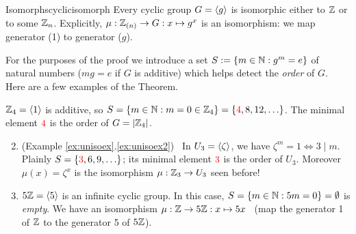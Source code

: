 \begin{thm}{Isomorphs}{cyclicisomorph}
	Every cyclic group $G=\left\langle g\right\rangle$ is isomorphic either to $\mathbb{Z}$ or to some $\mathbb{Z}_n$.\smallbreak
	Explicitly, $\mu:\mathbb{Z}_{(n)}\to G:x\mapsto g^x$ is an isomorphism: we map generator (1) to generator ($g$).
\end{thm}

For the purposes of the proof we introduce a set $S:=\{m\in\mathbb{N}:g^m=e\}$ of natural numbers ($mg=e$ if $G$ is additive) which helps detect the \emph{order} of $G$. Here are a few examples of the Theorem.

\begin{examples}{}{}
	\exstart $\mathbb{Z}_4=\left\langle 1\right\rangle$ is additive, so $S=\{m\in\mathbb{N}:m=0\in\mathbb{Z}_4\}=\{\textcolor{red}{4},8,12,\ldots\}$. The minimal element $\textcolor{red}{4}$ is the order of $G=\left| \mathbb{Z}_4\right|$.
	\begin{enumerate}\setcounter{enumi}{1}
	  \item (Example \ref*{ex:unisoex}.\ref{ex:unisoex2}) \ In $U_3=\left\langle \zeta\right\rangle$, we have $\zeta^m=1\Longleftrightarrow 3\mid m$. Plainly $S=\{\textcolor{red}{3},6,9,\ldots\}$; its minimal element $\textcolor{red}{3}$ is the order of $U_3$. Moreover $\mu(x)=\zeta^x$ is the isomorphism $\mu:\mathbb{Z}_3\to U_3$ seen before!
	  \item $5\mathbb{Z}=\left\langle 5\right\rangle$ is an infinite cyclic group. In this case, $S=\{m\in\mathbb{N}:5m=0\}=\emptyset$ is \emph{empty}. We have an isomorphism $\mu:\mathbb{Z}\to 5\mathbb{Z}:x\mapsto 5x$ \ (map the generator 1 of $\mathbb{Z}$ to the generator 5 of $5\mathbb{Z}$).
	\end{enumerate}
\end{examples}


